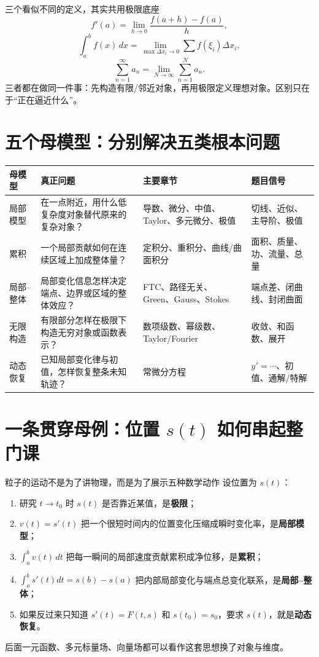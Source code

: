 \documentclass[11pt,a4paper,openany]{ctexbook}
\newcommand{\key}[1]{\textbf{\color{deep}#1}}
\begin{document}
\begin{examplebox}{三个看似不同的定义，其实共用极限底座}
\[
f'(a)=\lim_{h\to0}\frac{f(a+h)-f(a)}{h},
\]
\[
\int_a^b f(x)\,dx=\lim_{\max\Delta x_i\to0}\sum f(\xi_i)\Delta x_i,
\]
\[
\sum_{n=1}^{\infty}a_n=\lim_{N\to\infty}\sum_{n=1}^{N}a_n.
\]
三者都在做同一件事：先构造有限/邻近对象，再用极限定义理想对象。区别只在于“正在逼近什么”。
\end{examplebox}

\section{五个母模型：分别解决五类根本问题}
\begin{longtable}{L{2.8cm}L{5.0cm}L{4.0cm}L{\dimexpr\linewidth-11.97cm\relax}}
\toprule
\textbf{母模型} & \textbf{真正问题} & \textbf{主要章节} & \textbf{题目信号}\\
\midrule
局部模型 & 在一点附近，用什么低复杂度对象替代原来的复杂对象？ & 导数、微分、中值、Taylor、多元微分、极值 & 切线、近似、主导阶、极值\\
累积 & 一个局部贡献如何在连续区域上加成整体量？ & 定积分、重积分、曲线/曲面积分 & 面积、质量、功、流量、总量\\
局部--整体 & 局部变化信息怎样决定端点、边界或区域的整体效应？ & FTC、路径无关、Green、Gauss、Stokes & 端点差、闭曲线、封闭曲面\\
无限构造 & 有限部分怎样在极限下构造无穷对象或函数表示？ & 数项级数、幂级数、Taylor/Fourier & 收敛、和函数、展开\\
动态恢复 & 已知局部变化律与初值，怎样恢复整条未知轨迹？ & 常微分方程 & $y'=\cdots$、初值、通解/特解\\
\bottomrule
\end{longtable}

\section{一条贯穿母例：位置 $s(t)$ 如何串起整门课}
\begin{examplebox}{粒子的运动不是为了讲物理，而是为了展示五种数学动作}
设位置为 $s(t)$：
\begin{enumerate}
  \item 研究 $t\to t_0$ 时 $s(t)$ 是否靠近某值，是\key{极限}；
  \item $v(t)=s'(t)$ 把一个很短时间内的位置变化压缩成瞬时变化率，是\key{局部模型}；
  \item $\int_a^b v(t)\,dt$ 把每一瞬间的局部速度贡献累积成净位移，是\key{累积}；
  \item $\int_a^b s'(t)dt=s(b)-s(a)$ 把内部局部变化与端点总变化联系，是\key{局部--整体}；
  \item 如果反过来只知道 $s'(t)=F(t,s)$ 和 $s(t_0)=s_0$，要求 $s(t)$，就是\key{动态恢复}。
\end{enumerate}
后面一元函数、多元标量场、向量场都可以看作这套思想换了对象与维度。
\end{examplebox}
\end{document}
